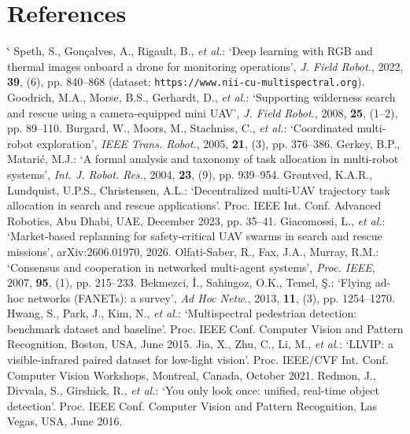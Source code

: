 \documentclass[10pt,a4paper,twocolumn]{article}
\makeatletter
\renewenvironment{thebibliography}[1]{\section{References}\list{\@biblabel{\@arabic\c@enumiv}}{\settowidth\labelwidth{\@biblabel{#1}}\leftmargin\labelwidth\advance\leftmargin\labelsep\setlength{\parsep}{0pt}\setlength{\itemsep}{2pt}\usecounter{enumiv}\let\p@enumiv\@empty\renewcommand\theenumiv{\@arabic\c@enumiv}}\sloppy\clubpenalty4000\@clubpenalty\clubpenalty\widowpenalty4000\sfcode`\.\@m}{\def\@noitemerr{\@latex@error{Empty thebibliography}\@ehc}\endlist}
\makeatother
\begin{document}
\begin{thebibliography}{99}
 Speth, S., Gon\c{c}alves, A., Rigault, B., \textit{et al.}: \textquoteleft{}Deep learning with RGB and thermal images onboard a drone for monitoring operations\textquoteright{}, \textit{J. Field Robot.}, 2022, \textbf{39}, (6), pp. 840--868 (dataset: \nolinkurl{https://www.nii-cu-multispectral.org}).
 Goodrich, M.A., Morse, B.S., Gerhardt, D., \textit{et al.}: \textquoteleft{}Supporting wilderness search and rescue using a camera-equipped mini UAV\textquoteright{}, \textit{J. Field Robot.}, 2008, \textbf{25}, (1--2), pp. 89--110.
 Burgard, W., Moors, M., Stachniss, C., \textit{et al.}: \textquoteleft{}Coordinated multi-robot exploration\textquoteright{}, \textit{IEEE Trans. Robot.}, 2005, \textbf{21}, (3), pp. 376--386.
 Gerkey, B.P., Matari\'c, M.J.: \textquoteleft{}A formal analysis and taxonomy of task allocation in multi-robot systems\textquoteright{}, \textit{Int. J. Robot. Res.}, 2004, \textbf{23}, (9), pp. 939--954.
 Gr{\o}ntved, K.A.R., Lundquist, U.P.S., Christensen, A.L.: \textquoteleft{}Decentralized multi-UAV trajectory task allocation in search and rescue applications\textquoteright{}. Proc. IEEE Int. Conf. Advanced Robotics, Abu Dhabi, UAE, December 2023, pp. 35--41.
 Giacomossi, L., \textit{et al.}: \textquoteleft{}Market-based replanning for safety-critical UAV swarms in search and rescue missions\textquoteright{}, arXiv:2606.01970, 2026.
 Olfati-Saber, R., Fax, J.A., Murray, R.M.: \textquoteleft{}Consensus and cooperation in networked multi-agent systems\textquoteright{}, \textit{Proc. IEEE}, 2007, \textbf{95}, (1), pp. 215--233.
 Bekmezci, \.I., Sahingoz, O.K., Temel, \c{S}.: \textquoteleft{}Flying ad-hoc networks (FANETs): a survey\textquoteright{}, \textit{Ad Hoc Netw.}, 2013, \textbf{11}, (3), pp. 1254--1270.
 Hwang, S., Park, J., Kim, N., \textit{et al.}: \textquoteleft{}Multispectral pedestrian detection: benchmark dataset and baseline\textquoteright{}. Proc. IEEE Conf. Computer Vision and Pattern Recognition, Boston, USA, June 2015.
 Jia, X., Zhu, C., Li, M., \textit{et al.}: \textquoteleft{}LLVIP: a visible-infrared paired dataset for low-light vision\textquoteright{}. Proc. IEEE/CVF Int. Conf. Computer Vision Workshops, Montreal, Canada, October 2021.
 Redmon, J., Divvala, S., Girshick, R., \textit{et al.}: \textquoteleft{}You only look once: unified, real-time object detection\textquoteright{}. Proc. IEEE Conf. Computer Vision and Pattern Recognition, Las Vegas, USA, June 2016.

\end{thebibliography}
\end{document}
